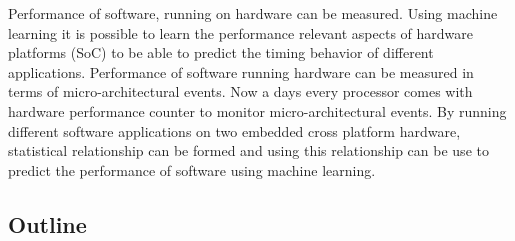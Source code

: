 \par Performance of software, running on hardware can be measured.  Using machine learning it is possible to learn the performance relevant aspects of hardware platforms (SoC) to be able to predict the timing behavior of different applications. Performance of software running hardware can be measured in terms of micro-architectural events. Now a days every processor comes with hardware performance counter to monitor micro-architectural events. By running different software applications on two embedded cross platform hardware, statistical relationship can be formed and using this relationship can be use to predict the performance of software using machine learning. 

\subsection{Outline}





